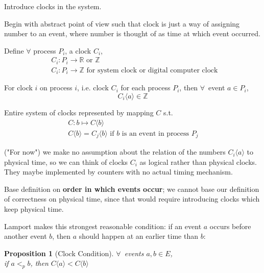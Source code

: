 \documentclass[10pt]{amsart}
\newtheorem{proposition}{Proposition}
\begin{document}
\begin{multicols*}{2}
Introduce clocks in the system.

Begin with abstract point of view such that clock is just a way of assigning number to an event, where number is thought of as time at which event occurred. 

Define $\forall $ process $P_i$, a clock $C_i$, 
\begin{equation}
\begin{aligned}
	& C_i : P_i \to \mathbb{R} \text{ or } \mathbb{Z} \\ 
	& C_i: P_i \to \mathbb{Z} \text{ for system clock or digital computer clock }
\end{aligned}
\end{equation}

For clock $i$ on process $i$, i.e. clock $C_i$ for each process $P_i$, then $\forall \, $ event $a\in P_i$, 
\begin{equation}
C_i\langle a \rangle \in \mathbb{Z}
\end{equation}

Entire system of clocks represented by mapping $C$ s.t. 
\begin{equation}
\begin{aligned}
& C: b \mapsto C \langle b \rangle \\
& C\langle b \rangle = C_j\langle b \rangle \text{ if $b$ is an event in process $P_j$ }
\end{aligned}
\end{equation}

("For now") we make no assumption about the relation of the numbers $C_i\langle a \rangle$ to physical time, so we can think of clocks $C_i$ as logical rather than physical clocks. They maybe implemented by counters with no actual timing mechanism.

Base definition on \textbf{order in which events occur}; we cannot base our definition of correctness on physical time, since that would require introducing clocks which keep physical time.

Lamport makes this strongest reasonable condition: if an event $a$ occurs before another event $b$, then $a$ should happen at an earlier time than $b$:

\begin{proposition}[Clock Condition]\label{Prop:ClockCondition}
	$\forall \, $ events $a,b \in E$, \\if $a <_p b$, then $C\langle a \rangle < C \langle b \rangle$
\end{proposition}


\end{multicols*}
\end{document}
